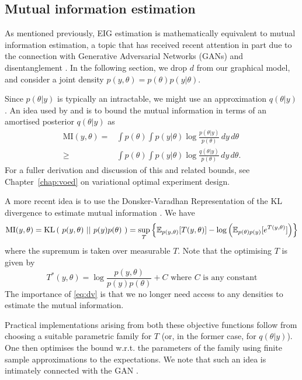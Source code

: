 \subsection{Mutual information estimation}
As mentioned previously, EIG estimation is mathematically equivalent to mutual information estimation, a topic that has received recent attention in part due to the connection with Generative Adversarial Networks (GANs) \cite{infogan} and disentanglement \cite{tianqichen}. In the following section, we drop $d$ from our graphical model, and consider a joint density $p(y, \theta) = p(\theta)p(y|\theta)$.

Since $p(\theta|y)$ is typically an intractable, we might use an approximation $q(\theta|y)$. An idea used by \cite{ba} and \cite{infogan} is to bound the mutual information in terms of an amortised posterior $q(\theta|y)$ as
\begin{align}
	\text{MI}(y, \theta) =& \int p(\theta) \int p(y|\theta) \log \frac{p(\theta | y)}{p(\theta)} \, dy \, d\theta \\
	\ge & \int p(\theta) \int p(y|\theta) \log \frac{q(\theta | y)}{p(\theta)} \, dy \, d\theta.
\end{align}
For a fuller derivation and discussion of this and related bounds, see Chapter~\ref{chap:voed} on variational optimal experiment design.

A more recent idea is to use the Donsker-Varadhan Representation of the KL divergence to estimate mutual information \cite{mine}. We have
\begin{equation}
	\label{eq:dv}
	\text{MI}(y, \theta) = \text{KL}\left(\ p(y, \theta)\ ||\ p(y)p(\theta)\ \right) = \sup_T \left\{ \mathbb{E}_{p(y,\theta)} [T(y, \theta)] - \log\left(\mathbb{E}_{p(\theta)p(y)}[e^{T(y,\theta)}] \right)  \right\}
\end{equation}
where the supremum is taken over measurable $T$. Note that the optimising $T$ is given by
\begin{equation}
	T^*(y, \theta) = \log\frac{p(y,\theta)}{p(y)p(\theta)} + C \text{ where }C\text{ is any constant}
\end{equation}
The importance of \eqref{eq:dv} is that we no longer need access to any densities to estimate the mutual information.

Practical implementations arising from both these objective functions follow from choosing a suitable parametric family for $T$ (or, in the former case, for $q(\theta|y)$). One then optimises the bound w.r.t. the parameters of the family using finite sample approximations to the expectations. We note that such an idea is intimately connected with the GAN \cite{fgan}.

